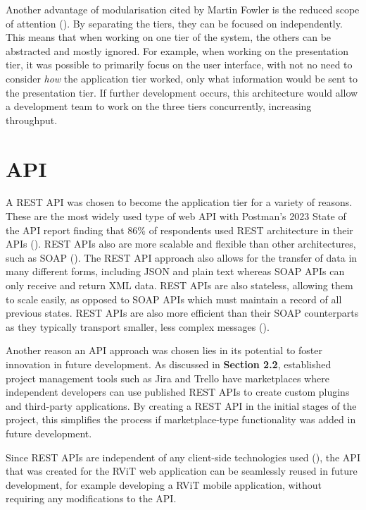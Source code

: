 \documentclass[l4proj.tex]{subfiles}
\begin{document}
Another advantage of modularisation cited by Martin Fowler is the reduced scope of attention (\cite{Fowler2015}). By separating the tiers, they can be focused on independently. This means that when working on one tier of the system, the others can be abstracted and mostly ignored. For example, when working on the presentation tier, it was possible to primarily focus on the user interface, with not no need to consider \textit{how} the application tier worked, only what information would be sent to the presentation tier. If further development occurs, this architecture would allow a development team to work on the three tiers concurrently, increasing throughput.

\section{API}
A REST API was chosen to become the application tier for a variety of reasons. These are the most widely used type of web API with Postman's 2023 State of the API report finding that 86\% of respondents used REST architecture in their APIs (\cite{Postman2023}). REST APIs also are more scalable and flexible than other architectures, such as SOAP (\cite{AWS}). The REST API approach also allows for the transfer of data in many different forms, including JSON and plain text whereas SOAP APIs can only receive and return XML data. REST APIs are also stateless, allowing them to scale easily, as opposed to SOAP APIs which must maintain a record of all previous states. REST APIs are also more efficient than their SOAP counterparts as they typically transport smaller, less complex messages (\cite{AWS}).

Another reason an API approach was chosen lies in its potential to foster innovation in future development. As discussed in \textbf{Section 2.2}, established project management tools such as Jira and Trello have marketplaces where independent developers can use published REST APIs to create custom plugins and third-party applications. By creating a REST API in the initial stages of the project, this simplifies the process if marketplace-type functionality was added in future development. 

Since REST APIs are independent of any client-side technologies used (\cite{PostmanBlog2023}), the API that was created for the RViT web application can be seamlessly reused in future development, for example developing a RViT mobile application, without requiring any modifications to the API. 
\end{document}
